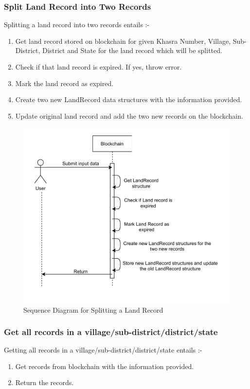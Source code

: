 \documentclass{article}
\begin{document}
    \subsubsection{Split Land Record into Two Records}
        Splitting a land record into two records entails :-
        \begin{enumerate}
            \item Get land record stored on blockchain for given Khasra Number, Village, Sub-District, District and State for the land record which will be splitted.
            \item Check if that land record is expired. If yes, throw error.
            \item Mark the land record as expired.
            \item Create two new LandRecord data structures with the information provided.
            \item Update original land record and add the two new records on the blockchain. 
        \end{enumerate}

        \begin{figure}[htbp]
            \includegraphics[scale=0.25]{blockchain_seq_split_land}
            \centering
            \caption{Sequence Diagram for Splitting a Land Record}
        \end{figure}
        
    \subsubsection{Get all records in a village/sub-district/district/state}
        Getting all records in a village/sub-district/district/state entails :-
        \begin{enumerate}
            \item Get records from blockchain with the information provided.
            \item Return the records.
        \end{enumerate}
\end{document}
